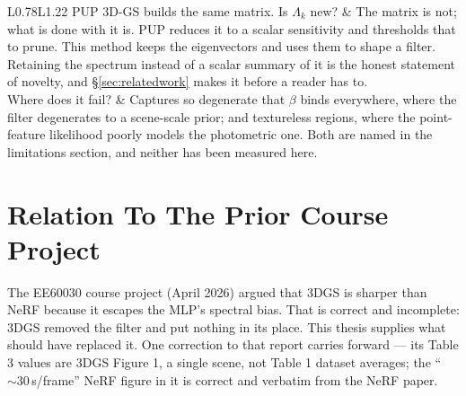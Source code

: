 \begin{table}[htbp]
\begin{tabularx}{\linewidth}{L{0.78}L{1.22}}
    PUP 3D-GS builds the same matrix. Is $\Lambda_k$ new? & The matrix is not; what is done with it is. PUP reduces it to a scalar sensitivity and thresholds that to prune. This method keeps the eigenvectors and uses them to shape a filter. Retaining the spectrum instead of a scalar summary of it is the honest statement of novelty, and \S\ref{sec:relatedwork} makes it before a reader has to. \\
    Where does it fail? & Captures so degenerate that $\beta$ binds everywhere, where the filter degenerates to a scene-scale prior; and textureless regions, where the point-feature likelihood poorly models the
    photometric one. Both are named in the limitations section, and neither has
    been measured here. \\
    \bottomrule
  \end{tabularx}
\end{table}

\section{Relation To The Prior Course Project}
The EE60030 course project (April 2026) argued that 3DGS is sharper than NeRF
because it escapes the MLP's spectral bias. That is correct and incomplete: 3DGS
removed the filter and put nothing in its place. This thesis supplies what should
have replaced it. One correction to that report carries forward --- its Table 3
values are 3DGS Figure 1, a single scene, not Table 1 dataset averages; the
``${\sim}30$\,s/frame'' NeRF figure in it is correct and verbatim from the NeRF
paper.
